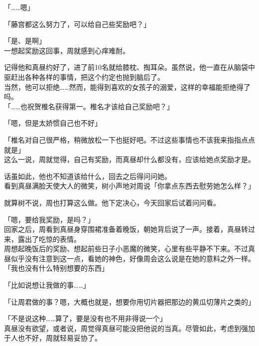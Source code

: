 「……嗯」

「藤宫都这么努力了，可以给自己些奖励吧？」

「是、是啊」\\

一想起奖励这回事，周就感到心痒难耐。

记得他和真昼约好了，进了前10名就给膝枕、掏耳朵。虽然说，他一直在从脑袋中驱赶出各种各样的事情，把这个约定也抛到脑后了。\\

当然，他可以拒绝……然而，能得到喜欢的女孩子的溺爱，这样的幸福能拒绝得了吗。\\

「……也祝贺椎名获得第一。椎名才该给自己奖励吧？」

「嗯，但是太娇惯自己也不好」

「椎名对自己很严格，稍微放松一下也挺好吧。不过这些事情也不该我来指指点点就是」\\

这么一说，周就觉得，自己有奖励，而真昼却什么都没有，应该给她点奖励才是。

话虽如此，他也不知道该给什么，回去之后得问问她。\\

看到真昼满脸天使大人的微笑，树小声地对周说「你拿点东西去慰劳她怎么样？」

就算树不说，周也打算这么做。他下定决心，今天回家后试着问问看。\\

\vspace{2\baselineskip}

「嗯，要给我奖励，是吗？」\\

回家之后，周看到真昼身穿围裙准备着晚饭，朝她背后说了一声。接着，真昼转过来，露出了吃惊的表情。\\

周想起晚饭后的奖励、想起前些日子小恶魔的微笑，心里有些平静不下来。不过真昼似乎没有注意到这一点，看她的神色，好像周会这么说是在她的意料之外一样。\\

「我也没有什么特别想要的东西」

「比如说想让我做的事……」

「让周君做的事？嗯，大概也就是，想要你用切片器把那边的黄瓜切薄片之类的」

「不是说这种……算了，要是没有也不用非得说一个」\\

真昼没有欲望，或者说，周觉得真昼可能没把他说的当真。尽管如此，考虑到强加于人也不好，周就轻易妥协了。\\

